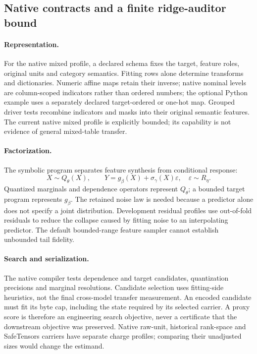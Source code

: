 \subsection{Native contracts and a finite ridge-auditor bound}
\label{sec:native-contracts}

\paragraph{Representation.}
For the native mixed profile, a declared schema fixes the target, feature roles, original units and category semantics.
Fitting rows alone determine transforms and dictionaries. Numeric affine maps retain their
inverse; native nominal levels are column-scoped indicators rather than ordered numbers; the optional Python example uses a separately declared target-ordered or one-hot map. Grouped
driver tests recombine indicators and masks into their original semantic features. The
current native mixed profile is explicitly bounded; its capability is not evidence of
general mixed-table transfer.

\paragraph{Factorization.}
The symbolic program separates feature synthesis from conditional response:
\begin{equation}
  X\sim Q_{\theta}(X),\qquad
  Y=g_{\beta}(X)+\sigma_{\gamma}(X)\varepsilon,
  \quad \varepsilon\sim R_{\eta}.
  \label{eq:compiler}
\end{equation}
Quantized marginals and dependence operators represent $Q_{\theta}$; a bounded target
program represents $g_{\beta}$. The retained noise law is needed because a predictor alone
does not specify a joint distribution. Development residual profiles use out-of-fold
residuals to reduce the collapse caused by fitting noise to an interpolating predictor.
The default bounded-range feature sampler cannot establish unbounded tail fidelity.

\paragraph{Search and serialization.}
The native compiler tests dependence and target candidates, quantization precisions and
marginal resolutions. Candidate selection uses fitting-side heuristics, not the final
cross-model transfer measurement. An encoded candidate must fit its byte cap, including
the state required by its selected carrier. A proxy score is therefore an engineering
search objective, never a certificate that the downstream objective was preserved.
Native raw-unit, historical rank-space and SafeTensors carriers have separate charge
profiles; comparing their unadjusted sizes would change the estimand.


